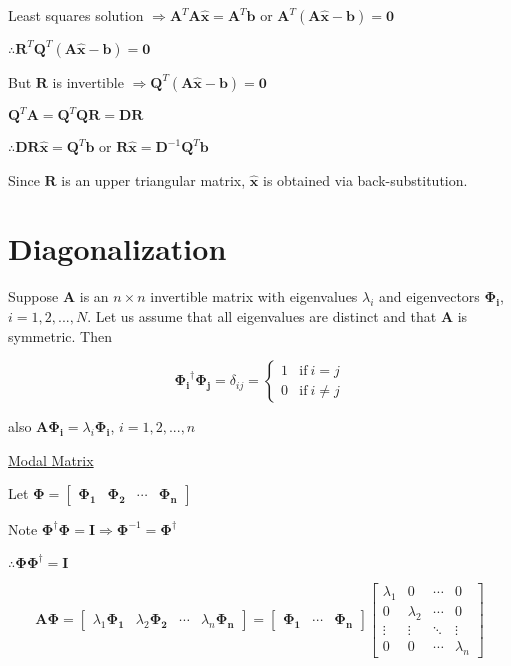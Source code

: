 \documentclass[fleqn]{article}
\begin{document}
	Least squares solution $\Rightarrow \mathbf{A}^T\mathbf{A\hat{x}} = \mathbf{A}^T\mathbf{b}$ or $\mathbf{A}^T(\mathbf{A\hat{x}} - \mathbf{b}) = \mathbf{0}$
	
	$\therefore \mathbf{R}^T\mathbf{Q}^T(\mathbf{A\hat{x}} - \mathbf{b}) = \mathbf{0}$
	
	But $\mathbf{R}$ is invertible $\Rightarrow \mathbf{Q}^T(\mathbf{A\hat{x}} - \mathbf{b}) = \mathbf{0}$
	
	$\mathbf{Q}^T\mathbf{A} = \mathbf{Q}^T\mathbf{QR} = \mathbf{DR}$
	
	$\therefore \mathbf{DR\hat{x}} = \mathbf{Q}^T\mathbf{b}$ or $\mathbf{R\hat{x}} = \mathbf{D}^{-1}\mathbf{Q}^T\mathbf{b}$
	
	Since $\mathbf{R}$ is an upper triangular matrix, $\mathbf{\hat{x}}$ is obtained via back-substitution.
	
	\section{Diagonalization}
	
	Suppose $\mathbf{A}$ is an $n \times n$ invertible matrix with eigenvalues $\lambda_i$ and eigenvectors $\mathbf{\Phi_i}$, $i = 1,2,...,N$. Let us assume that all eigenvalues are distinct and that $\mathbf{A}$ is symmetric. Then
	
	\begin{equation*}
		\mathbf{\Phi_i}^{\dag}\mathbf{\Phi_j} = \delta_{ij} = \begin{cases}
			1 & \text{if}\ i = j\\
			0 & \text{if}\ i \neq j
		\end{cases}
	\end{equation*}
	
	also $\mathbf{A\Phi_i} = \lambda_i\mathbf{\Phi_i}$, $i = 1,2,...,n$
	
	\underline{Modal Matrix}
	
	Let $\mathbf{\Phi} = \begin{bmatrix}\mathbf{\Phi_1} & \mathbf{\Phi_2} & \cdots & \mathbf{\Phi_n}\end{bmatrix}$
	
	Note $\mathbf{\Phi}^{\dag}\mathbf{\Phi} = \mathbf{I} \Rightarrow \mathbf{\Phi}^{-1} = \mathbf{\Phi}^{\dag}$
	
	$\therefore \mathbf{\Phi}\mathbf{\Phi}^{\dag} = \mathbf{I}$
	
	\begin{equation*}
		\mathbf{A\Phi} = \begin{bmatrix}
			\lambda_1\mathbf{\Phi_1} &
			\lambda_2\mathbf{\Phi_2} &
			\cdots &
			\lambda_n\mathbf{\Phi_n}
		\end{bmatrix} = \begin{bmatrix}
			\mathbf{\Phi_1} & \cdots & \mathbf{\Phi_n}
		\end{bmatrix}\begin{bmatrix}
			\lambda_1 & 0 & \cdots & 0\\
			0 & \lambda_2 & \cdots & 0\\
			\vdots & \vdots & \ddots & \vdots\\
			0 & 0 & \cdots & \lambda_n
		\end{bmatrix}
	\end{equation*}
	
\end{document}
